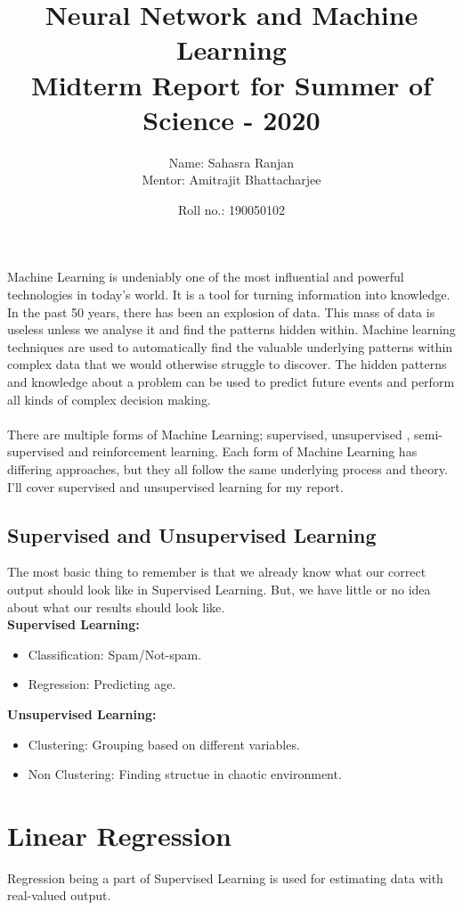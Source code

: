 \documentclass[12pt, A4]{report}
\title{\textbf{Neural Network and Machine Learning}\\\large{Midterm Report for Summer of Science - 2020}}
\author{Name: Sahasra Ranjan\\Mentor: Amitrajit Bhattacharjee}
\date{Roll no.: 190050102}
\begin{document}
\begin{titlepage}
\maketitle
\end{titlepage}

Machine Learning is undeniably one of the most influential and powerful technologies in today’s world. It is a tool for turning information into knowledge. In the past 50 years, there has been an explosion of data. This mass of data is useless unless we analyse it and find the patterns hidden within. Machine learning techniques are used to automatically find the valuable underlying patterns within complex data that we would otherwise struggle to discover. The hidden patterns and knowledge about a problem can be used to predict future events and perform all kinds of complex decision making.\\\\
There are multiple forms of Machine Learning; supervised, unsupervised , semi-supervised and reinforcement learning. Each form of Machine Learning has differing approaches, but they all follow the same underlying process and theory. I'll cover supervised and unsupervised learning for my report.

\section*{Supervised and Unsupervised Learning}
  The most basic thing to remember is that we already know what our correct output should look like in Supervised Learning.
  But, we have little or no idea about what our results should look like.\\

  \textbf{Supervised Learning:}
  \begin{itemize}
    \item Classification: Spam/Not-spam. 
    \item Regression: Predicting age.
  \end{itemize}

  \textbf{Unsupervised Learning:}
  \begin{itemize}
    \item Clustering: Grouping based on different variables.
    \item Non Clustering: Finding structue in chaotic environment.
  \end{itemize}

\chapter{Linear Regression}
  Regression being a part of Supervised Learning is used for estimating data with real-valued output.  
\end{document}
